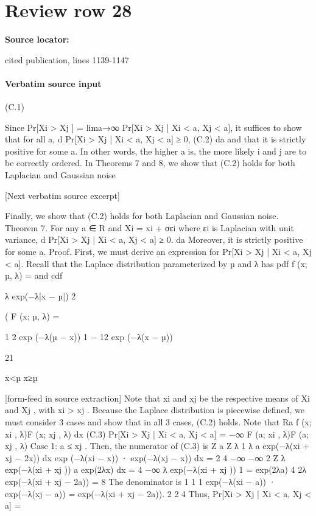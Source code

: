 \documentclass[10pt]{article}
\begin{document}
\section*{Review row 28}
\textbf{Source locator:} {\footnotesize\raggedright cited publication, lines 1139-\allowbreak{}1147\par}
\paragraph{Verbatim source input}
\begin{ReviewVerbatim}
(C.1)

Since Pr[Xi > Xj ] = lima→∞ Pr[Xi > Xj | Xi < a, Xj < a], it suffices to show that for all a,
d
Pr[Xi > Xj | Xi < a, Xj < a] ≥ 0,
(C.2)
da
and that it is strictly positive for some a. In other words, the higher a is, the more likely i and j are to be
correctly ordered. In Theorems 7 and 8, we show that (C.2) holds for both Laplacian and Gaussian noise

[Next verbatim source excerpt]

Finally, we show that (C.2) holds for both Laplacian and Gaussian noise.
Theorem 7. For any a ∈ R and Xi = xi + σεi where εi is Laplacian with unit variance,
d
Pr[Xi > Xj | Xi < a, Xj < a] ≥ 0.
da
Moreover, it is strictly positive for some a.
Proof. First, we must derive an expression for Pr[Xi > Xj | Xi < a, Xj < a]. Recall that the Laplace
distribution parameterized by µ and λ has pdf
f (x; µ, λ) =
and cdf

λ
exp(−λ|x − µ|)
2

(
F (x; µ, λ) =

1
2 exp (−λ(µ − x))
1 − 12 exp (−λ(x − µ))

21

x<µ
x≥µ


[form-feed in source extraction]
Note that xi and xj be the respective means of Xi and Xj , with xi > xj . Because the Laplace distribution
is piecewise defined, we must consider 3 cases and show that in all 3 cases, (C.2) holds. Note that
Ra
f (x; xi , λ)F (x; xj , λ) dx
(C.3)
Pr[Xi > Xj | Xi < a, Xj < a] = −∞
F (a; xi , λ)F (a; xj , λ)
Case 1: a ≤ xj .
Then, the numerator of (C.3) is
Z a
Z
λ
1
λ a
exp(−λ(xi + xj − 2x)) dx
exp (−λ(xi − x)) · exp(−λ(xj − x)) dx =
2
4 −∞
−∞ 2
Z
λ exp(−λ(xi + xj )) a
exp(2λx) dx
=
4
−∞
λ exp(−λ(xi + xj )) 1
=
exp(2λa)
4
2λ
exp(−λ(xi + xj − 2a))
=
8
The denominator is
1
1
1
exp(−λ(xi − a)) · exp(−λ(xj − a)) = exp(−λ(xi + xj − 2a)).
2
2
4
Thus,
Pr[Xi > Xj | Xi < a, Xj < a] =


\end{ReviewVerbatim}
\end{document}
